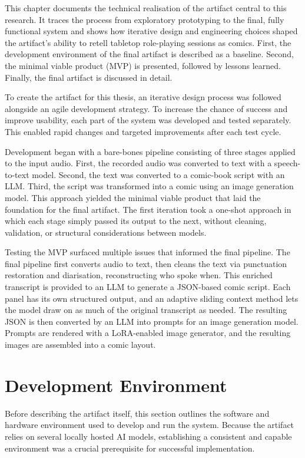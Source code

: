 \label{sec:Implementation}
This chapter documents the technical realisation of the artifact central to this research. It traces the process from exploratory prototyping to the final, fully functional system and shows how iterative design and engineering choices shaped the artifact's ability to retell tabletop role-playing sessions as comics. First, the development environment of the final artifact is described as a baseline. Second, the minimal viable product (MVP) is presented, followed by lessons learned. Finally, the final artifact is discussed in detail.

To create the artifact for this thesis, an iterative design process was followed alongside an agile development strategy. To increase the chance of success and improve usability, each part of the system was developed and tested separately. This enabled rapid changes and targeted improvements after each test cycle.

Development began with a bare-bones pipeline consisting of three stages applied to the input audio. First, the recorded audio was converted to text with a speech-to-text model. Second, the text was converted to a comic-book script with an LLM. Third, the script was transformed into a comic using an image generation model. This approach yielded the minimal viable product that laid the foundation for the final artifact. The first iteration took a one-shot approach in which each stage simply passed its output to the next, without cleaning, validation, or structural considerations between models.

Testing the MVP surfaced multiple issues that informed the final pipeline. The final pipeline first converts audio to text, then cleans the text via punctuation restoration and diarisation, reconstructing who spoke when. This enriched transcript is provided to an LLM to generate a JSON-based comic script. Each panel has its own structured output, and an adaptive sliding context method lets the model draw on as much of the original transcript as needed. The resulting JSON is then converted by an LLM into prompts for an image generation model. Prompts are rendered with a LoRA-enabled image generator, and the resulting images are assembled into a comic layout.

\section{Development Environment}
Before describing the artifact itself, this section outlines the software and hardware environment used to develop and run the system. Because the artifact relies on several locally hosted AI models, establishing a consistent and capable environment was a crucial prerequisite for successful implementation.

